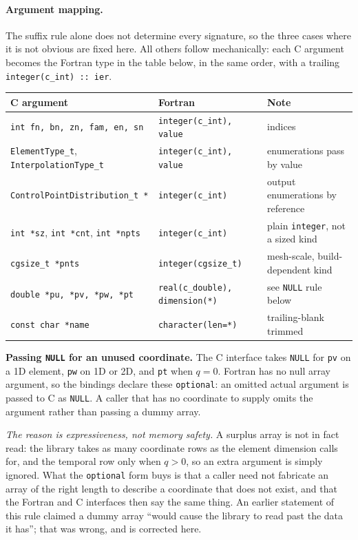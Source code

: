 \documentclass[11pt,letterpaper]{article}
\newif\ifvfourdraft
\newenvironment{v4block}{\ifvfourdraft\color{v4violet}\fi\ignorespaces}{\par}
\newcommand{\vfourmark}{\ifvfourdraft\textcolor{v4violet}{\textbf{[v4]}}\ \fi}
\begin{document}
\begin{v4block}
\paragraph{\vfourmark Argument mapping.}
The suffix rule alone does not determine every signature, so the three cases where
it is not obvious are fixed here.  All others follow mechanically: each C argument
becomes the Fortran type in the table below, in the same order, with a trailing
\texttt{integer(c\_int) :: ier}.

\smallskip
{\footnotesize
\begin{tabular}{@{} l l l @{}}
\toprule
\textbf{C argument} & \textbf{Fortran} & \textbf{Note} \\
\midrule
\texttt{int fn, bn, zn, fam, en, sn}
  & \texttt{integer(c\_int), value}      & indices \\
\texttt{ElementType\_t}, \texttt{InterpolationType\_t}
  & \texttt{integer(c\_int), value}      & enumerations pass by value \\
\texttt{ControlPointDistribution\_t *}
  & \texttt{integer(c\_int)}             & output enumerations by reference \\
\texttt{int *sz}, \texttt{int *cnt}, \texttt{int *npts}
  & \texttt{integer(c\_int)}             & plain \texttt{integer}, not a sized kind \\
\texttt{cgsize\_t *pnts}
  & \texttt{integer(cgsize\_t)}          & mesh-scale, build-dependent kind \\
\texttt{double *pu, *pv, *pw, *pt}
  & \texttt{real(c\_double), dimension(*)} & see \texttt{NULL} rule below \\
\texttt{const char *name}
  & \texttt{character(len=*)}            & trailing-blank trimmed \\
\bottomrule
\end{tabular}
\par}

\smallskip
\noindent\textbf{Passing \texttt{NULL} for an unused coordinate.}  The C interface
takes \texttt{NULL} for \texttt{pv} on a 1D element, \texttt{pw} on 1D or 2D, and
\texttt{pt} when $q = 0$.  Fortran has no null array argument, so the bindings
declare these \texttt{optional}: an omitted actual argument is passed to C as
\texttt{NULL}.  A caller that has no coordinate to supply omits the argument
rather than passing a dummy array.

\vfourmark \emph{The reason is expressiveness, not memory safety.}  A surplus
array is not in fact read: the library takes as many coordinate rows as the
element dimension calls for, and the temporal row only when $q > 0$, so an extra
argument is simply ignored.  What the \texttt{optional} form buys is that a
caller need not fabricate an array of the right length to describe a coordinate
that does not exist, and that the Fortran and C interfaces then say the same
thing.  An earlier statement of this rule claimed a dummy array ``would cause the
library to read past the data it has''; that was wrong, and is corrected here.


\end{v4block}
\end{document}
